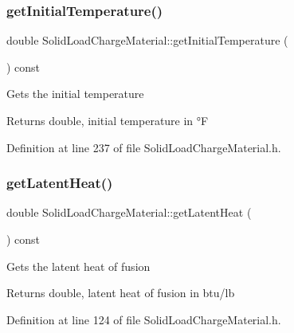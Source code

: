 \subsubsection{\texorpdfstring{get\+Initial\+Temperature()}{getInitialTemperature()}\hspace{0.1cm}{\footnotesize\ttfamily [3/3]}}
{\footnotesize\ttfamily double Solid\+Load\+Charge\+Material\+::get\+Initial\+Temperature (\begin{DoxyParamCaption}{ }\end{DoxyParamCaption}) const\hspace{0.3cm}{\ttfamily [inline]}}

Gets the initial temperature \begin{DoxyReturn}{Returns}
double, initial temperature in °F 
\end{DoxyReturn}


Definition at line 237 of file Solid\+Load\+Charge\+Material.\+h.

\mbox{\label{class_solid_load_charge_material_add60191bd282a9cefa4bf7a60301711b}} 
\subsubsection{\texorpdfstring{get\+Latent\+Heat()}{getLatentHeat()}\hspace{0.1cm}{\footnotesize\ttfamily [1/3]}}
{\footnotesize\ttfamily double Solid\+Load\+Charge\+Material\+::get\+Latent\+Heat (\begin{DoxyParamCaption}{ }\end{DoxyParamCaption}) const\hspace{0.3cm}{\ttfamily [inline]}}

Gets the latent heat of fusion \begin{DoxyReturn}{Returns}
double, latent heat of fusion in btu/lb 
\end{DoxyReturn}


Definition at line 124 of file Solid\+Load\+Charge\+Material.\+h.

\mbox{\label{class_solid_load_charge_material_add60191bd282a9cefa4bf7a60301711b}} 
